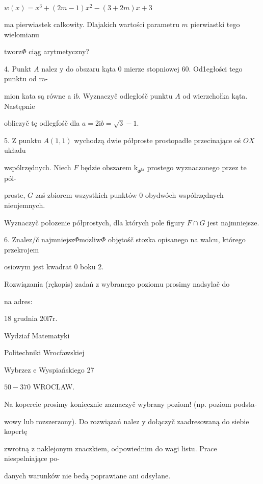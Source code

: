 \documentclass[a4paper,12pt]{article}
\begin{document}
$w(x)=x^{3}+(2m-1)x^{2}-(3+2m)x+3$

ma pierwiastek całkowity. Dlajakich wartości parametru $m$ pierwiastki tego wielomianu

$\mathrm{t}\mathrm{w}\mathrm{o}\mathrm{r}\mathrm{z}\Phi$ ciąg arytmetyczny?

4. Punkt $A$ nalez $\mathrm{y}$ do obszaru kąta $0$ mierze stopniowej 60. Od1egłości tego punktu od ra-

mion kata są równe a $\mathrm{i}b$. Wyznaczyč odleglośč punktu $A$ od wierzchołka kąta. Następnie

obliczyč tę odlegfośč dla $a=2\mathrm{i}b=\sqrt{3}-1.$

5. $\mathrm{Z}$ punktu $A(1,1)$ wychodzą dwie półproste prostopadłe przecinające oś $OX$ układu

wspólrzędnych. Niech $F$ będzie obszarem $\mathrm{k}_{\Phi^{\mathrm{t}\mathrm{a}}}$ prostego wyznaczonego przez te pól-

proste, $G$ zaś zbiorem wszystkich punktów $0$ obydwóch wspólrzędnych nieujemnych.

Wyznaczyč połozenie półprostych, dla których pole figury $F\cap G$ jest najmniejsze.

6. Znalez/č $\mathrm{n}\mathrm{a}\mathrm{j}\mathrm{m}\mathrm{n}\mathrm{i}\mathrm{e}\mathrm{j}\mathrm{s}\mathrm{z}\Phi \mathrm{m}\mathrm{o}\dot{\mathrm{z}}\mathrm{l}\mathrm{i}\mathrm{w}\Phi$ objętośč stozka opisanego na walcu, którego przekrojem

osiowym jest kwadrat $0$ boku 2.

Rozwiązania (rękopis) zadań z wybranego poziomu prosimy nadsylač do

na adres:

18 grudnia 20l7r.

Wydziaf Matematyki

Politechniki Wrocfawskiej

Wybrzez $\mathrm{e}$ Wyspiańskiego 27

$50-370$ WROCLAW.

Na kopercie prosimy $\underline{\mathrm{k}\mathrm{o}\mathrm{n}\mathrm{i}\mathrm{e}\mathrm{c}\mathrm{z}\mathrm{n}\mathrm{i}\mathrm{e}}$ zaznaczyč wybrany poziom! (np. poziom podsta-

wowy lub rozszerzony). Do rozwiązań nalez $\mathrm{y}$ dołączyč zaadresowaną do siebie kopertę

zwrotną $\mathrm{z}$ naklejonym znaczkiem, odpowiednim do wagi listu. Prace niespelniające po-

danych warunków nie bedą poprawiane ani odsyłane.
\end{document}
